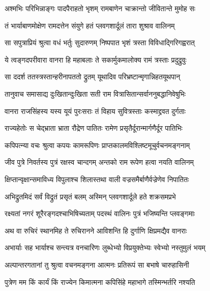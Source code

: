 \twolineshloka
{अश्मभिः परिभिन्नाङ्गः पादपैराहतो भृशम्}
{रामबाणेन चाक्रान्तो जीवितान्ते मुमोह सः} %

\twolineshloka
{तं भार्याबाणमोक्षेण रामदत्तेन संयुगे}
{हतं प्लवगशार्दूलं तारा शुश्राव वालिनम्} %

\twolineshloka
{सा सपुत्राप्रियं श्रुत्वा वधं भर्तुः सुदारुणम्}
{निष्पपात भृशं त्रस्ता विविधाद्गिरिगह्वरात्} %

\twolineshloka
{ये त्वङ्गदपरीवारा वानरा हि महाबलाः}
{ते सकार्मुकमालोक्य रामं त्रस्ताः प्रदुद्रुवुः} %

\twolineshloka
{सा ददर्श ततस्त्रस्तान्हरीनापततो द्रुतम्}
{यूथादिव परिभ्रष्टान्मृगान्निहतयूथपान्} %

\twolineshloka
{तानुवाच समासाद्य दुःखितान्दुःखिता सती}
{राम वित्रासितान्सर्वाननुबद्धानिवेषुभिः} %

\twolineshloka
{वानरा राजसिंहस्य यस्य यूयं पुरःसराः}
{तं विहाय सुवित्रस्ताः कस्माद्द्रवत दुर्गताः} %

\twolineshloka
{राज्यहेतोः स चेद्भ्राता भ्राता रौद्रेण पातितः}
{रामेण प्रसृतैर्दूरान्मार्गणैर्दूर पातिभिः} %

\twolineshloka
{कपिपत्न्या वचः श्रुत्वा कपयः कामरूपिणः}
{प्राप्तकालमविश्लिष्टमूचुर्वचनमङ्गनाम्} %

\twolineshloka
{जीव पुत्रे निवर्तस्य पुत्रं रक्षस्व चान्दगम्}
{अन्तको राम रूपेण हत्वा नयति वालिनम्} %

\twolineshloka
{क्षिप्तान्वृक्षान्समाविध्य विपुलाश्च शिलास्तथा}
{वाली वज्रसमैर्बाणैर्वज्रेणेव निपातितः} %

\twolineshloka
{अभिद्रुतमिदं सर्वं विद्रुतं प्रसृतं बलम्}
{अस्मिन् प्लवगशार्दूले हते शक्रसमप्रभे} %

\twolineshloka
{रक्ष्यतां नगरं शूरैरङ्गदश्चाभिषिच्यताम्}
{पदस्थं वालिनः पुत्रं भजिष्यन्ति प्लवङ्गमाः} %

\twolineshloka
{अथ वा रुचिरं स्थानमिह ते रुचिरानने}
{आविशन्ति हि दुर्गाणि क्षिप्रमद्यैव वानराः} %

\twolineshloka
{अभार्याः सह भार्याश्च सन्त्यत्र वनचारिणः}
{लुब्धेभ्यो विप्रयुक्तेभ्यः स्वेभ्यो नस्तुमुलं भयम्} %

\twolineshloka
{अल्पान्तरगतानां तु श्रुत्वा वचनमङ्गना}
{आत्मनः प्रतिरूपं सा बभाषे चारुहासिनी} %

\twolineshloka
{पुत्रेण मम किं कार्यं किं राज्येन किमात्मना}
{कपिसिंहे महाभागे तस्मिन्भर्तरि नश्यति} %


